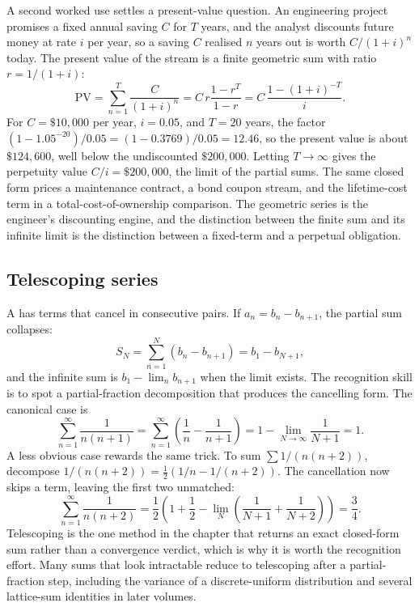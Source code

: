 A second worked use settles a present-value question. An engineering
project promises a fixed annual saving $C$ for $T$ years, and the
analyst discounts future money at rate $i$ per year, so a saving $C$
realised $n$ years out is worth $C/(1 + i)^{n}$ today. The present
value of the stream is a finite geometric sum with ratio $r = 1/(1 +
i)$:
\[
\text{PV} = \sum_{n=1}^{T} \frac{C}{(1 + i)^{n}} = C \, r
\frac{1 - r^{T}}{1 - r} = C \, \frac{1 - (1 + i)^{-T}}{i}.
\]
For $C = \$10{,}000$ per year, $i = 0.05$, and $T = 20$ years, the
factor $(1 - 1.05^{-20})/0.05 = (1 - 0.3769)/0.05 = 12.46$, so the
present value is about $\$124{,}600$, well below the undiscounted
$\$200{,}000$. Letting $T \to \infty$ gives the perpetuity value $C/i =
\$200{,}000$, the limit of the partial sums. The same closed form
prices a maintenance contract, a bond coupon stream, and the
lifetime-cost term in a total-cost-of-ownership comparison. The
geometric series is the engineer's discounting engine, and the
distinction between the finite sum and its infinite limit is the
distinction between a fixed-term and a perpetual obligation.

\subsection{Telescoping series}

A  has terms that cancel in consecutive
pairs. If $a_{n} = b_{n} - b_{n+1}$, the partial sum collapses:
\[
S_{N} = \sum_{n=1}^{N} (b_{n} - b_{n+1}) = b_{1} - b_{N+1},
\]
and the infinite sum is $b_{1} - \lim_{n} b_{n+1}$ when the limit
exists. The recognition skill is to spot a partial-fraction
decomposition that produces the cancelling form. The canonical case is
\[
\sum_{n=1}^{\infty} \frac{1}{n(n+1)} = \sum_{n=1}^{\infty}
\left(\frac{1}{n} - \frac{1}{n+1}\right) = 1 - \lim_{N \to \infty}
\frac{1}{N+1} = 1.
\]
A less obvious case rewards the same trick. To sum $\sum 1/(n(n+2))$,
decompose $1/(n(n+2)) = \tfrac{1}{2}(1/n - 1/(n+2))$. The cancellation
now skips a term, leaving the first two unmatched:
\[
\sum_{n=1}^{\infty} \frac{1}{n(n+2)} = \frac{1}{2}\left(1 + \frac{1}{2}
- \lim_{N}\left(\frac{1}{N+1} + \frac{1}{N+2}\right)\right) = \frac{3}{4}.
\]
Telescoping is the one method in the chapter that returns an exact
closed-form sum rather than a convergence verdict, which is why it is
worth the recognition effort. Many sums that look intractable reduce to
telescoping after a partial-fraction step, including the variance of a
discrete-uniform distribution and several lattice-sum identities in
later volumes.


